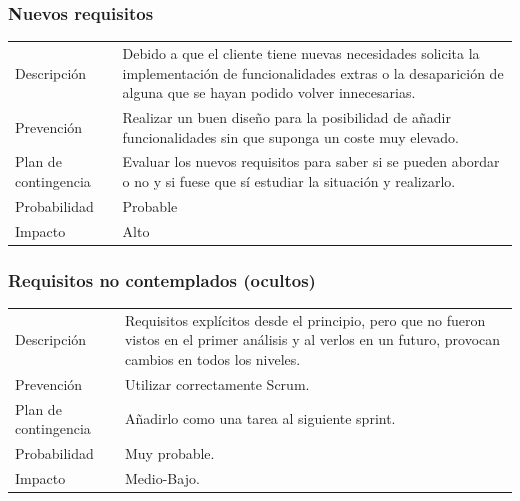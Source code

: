 \subsubsection{Nuevos requisitos}
\begin{table}[H]
    \begin{center}
        \begin{tabular}{l p{8cm}}
            Descripci\'{o}n                 & Debido a que el cliente tiene nuevas necesidades solicita la
            								  implementaci\'{o}n de funcionalidades extras o la desaparici\'{o}n de alguna que se 
            								  hayan podido volver innecesarias. \\
            Prevenci\'{o}n                  & Realizar un buen dise\~{n}o para la posibilidad de añadir
            								  funcionalidades sin que suponga un coste muy elevado. \\ 
            Plan de contingencia            & Evaluar los nuevos requisitos para saber si se pueden
            								  abordar o no y si fuese que s\'i estudiar la situación y realizarlo. \\
            Probabilidad                    & Probable \\
            Impacto                         & Alto \\
        \end{tabular}
    \end{center}
    
\end{table}

\subsubsection{Requisitos no contemplados (ocultos)}
\begin{table}[H]
    \begin{center}
        \begin{tabular}{l p{8cm}}
            Descripci\'{o}n                 & Requisitos explícitos desde el principio, pero que no fueron
            vistos en el primer an\'{a}lisis y al verlos en un futuro, provocan cambios en todos los niveles. \\
            Prevenci\'{o}n                  & Utilizar correctamente Scrum. \\ 
            Plan de contingencia            & A\~{n}adirlo como una tarea al siguiente sprint. \\
            Probabilidad                    & Muy probable. \\
            Impacto                         & Medio-Bajo. \\
        \end{tabular}
    \end{center}
    
\end{table}


